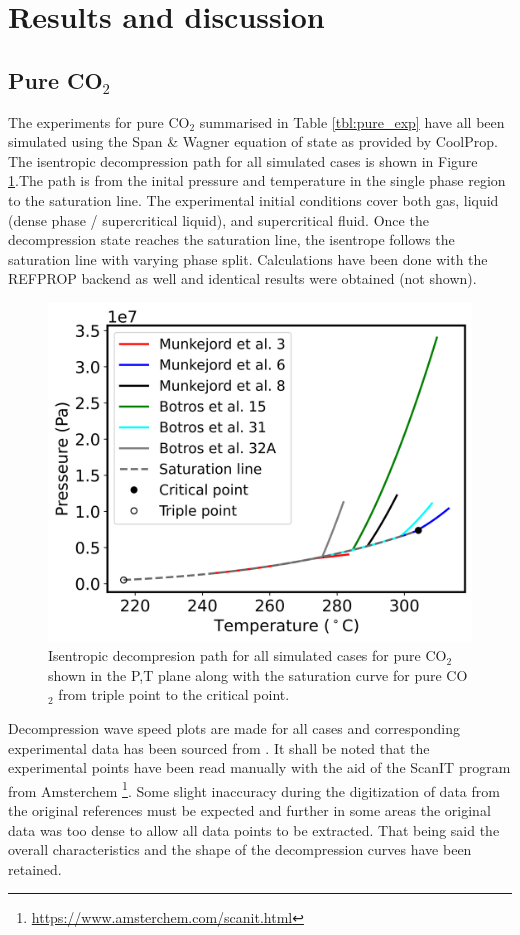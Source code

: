 \documentclass[a4paper, 10pt, twocolumn, twoside]{scrartcl}
\begin{document}
\section{Results and discussion}
\subsection{Pure CO$_2$}
The experiments for pure CO$_2$ summarised in Table \ref{tbl:pure_exp} have all been simulated using the Span \& Wagner equation of state as provided by CoolProp. The isentropic decompression path for all simulated cases is shown in Figure \ref{fig:pure_envelope}.The path is from the inital pressure and temperature in the single phase region to the saturation line. The experimental initial conditions cover both gas, liquid (dense phase / supercritical liquid), and supercritical fluid. Once the decompression state reaches the saturation line, the isentrope follows the saturation line with varying phase split. Calculations have been done with the REFPROP backend as well and identical results were obtained (not shown).  

\begin{figure}[!ht]
\centering
\includegraphics[width=\columnwidth]{./Bilder/pure_envelope.png}
\caption{Isentropic decompresion path for all simulated cases for pure CO$_2$ shown in the P,T plane along with the saturation curve for pure CO$_2$ from triple point to the critical point. }
\label{fig:pure_envelope}
\end{figure}

Decompression wave speed plots are made for all cases and corresponding experimental data has been sourced from \cite{MUNKEJORD2020118560,Botros_pure}. It shall be noted that the experimental points have been read manually with the aid of the ScanIT program from Amsterchem \footnote{\url{https://www.amsterchem.com/scanit.html}}. Some slight inaccuracy during the digitization of data from the original references must be expected and further in some areas the original data was too dense to allow all data points to be extracted. That being said the overall characteristics and the shape of the decompression curves have been retained. 
\end{document}

